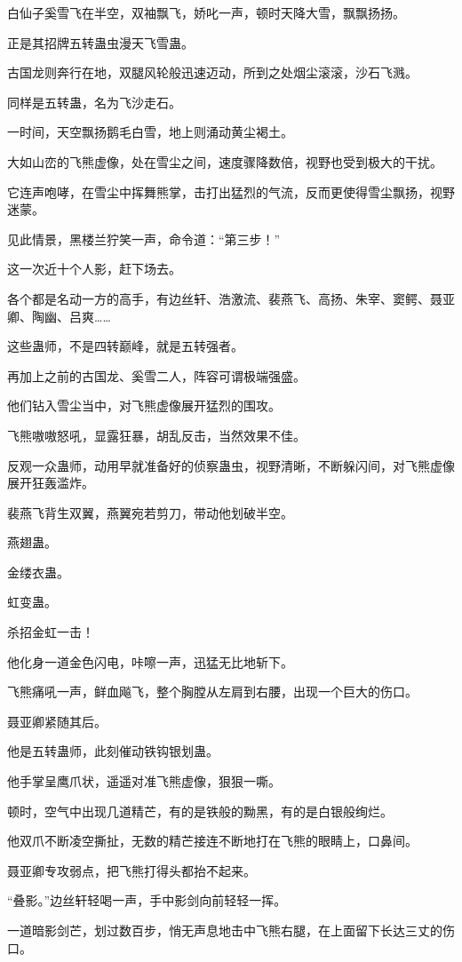 \begin{this_body}
白仙子奚雪飞在半空，双袖飘飞，娇叱一声，顿时天降大雪，飘飘扬扬。

正是其招牌五转蛊虫漫天飞雪蛊。

古国龙则奔行在地，双腿风轮般迅速迈动，所到之处烟尘滚滚，沙石飞溅。

同样是五转蛊，名为飞沙走石。

一时间，天空飘扬鹅毛白雪，地上则涌动黄尘褐土。

大如山峦的飞熊虚像，处在雪尘之间，速度骤降数倍，视野也受到极大的干扰。

它连声咆哮，在雪尘中挥舞熊掌，击打出猛烈的气流，反而更使得雪尘飘扬，视野迷蒙。

见此情景，黑楼兰狞笑一声，命令道：“第三步！”

这一次近十个人影，赶下场去。

各个都是名动一方的高手，有边丝轩、浩激流、裴燕飞、高扬、朱宰、窦鳄、聂亚卿、陶幽、吕爽……

这些蛊师，不是四转巅峰，就是五转强者。

再加上之前的古国龙、奚雪二人，阵容可谓极端强盛。

他们钻入雪尘当中，对飞熊虚像展开猛烈的围攻。

飞熊嗷嗷怒吼，显露狂暴，胡乱反击，当然效果不佳。

反观一众蛊师，动用早就准备好的侦察蛊虫，视野清晰，不断躲闪间，对飞熊虚像展开狂轰滥炸。

裴燕飞背生双翼，燕翼宛若剪刀，带动他划破半空。

燕翅蛊。

金缕衣蛊。

虹变蛊。

杀招金虹一击！

他化身一道金色闪电，咔嚓一声，迅猛无比地斩下。

飞熊痛吼一声，鲜血飚飞，整个胸膛从左肩到右腰，出现一个巨大的伤口。

聂亚卿紧随其后。

他是五转蛊师，此刻催动铁钩银划蛊。

他手掌呈鹰爪状，遥遥对准飞熊虚像，狠狠一嘶。

顿时，空气中出现几道精芒，有的是铁般的黝黑，有的是白银般绚烂。

他双爪不断凌空撕扯，无数的精芒接连不断地打在飞熊的眼睛上，口鼻间。

聂亚卿专攻弱点，把飞熊打得头都抬不起来。

“叠影。”边丝轩轻喝一声，手中影剑向前轻轻一挥。

一道暗影剑芒，划过数百步，悄无声息地击中飞熊右腿，在上面留下长达三丈的伤口。


\end{this_body}
